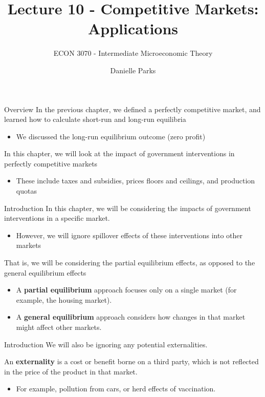 \documentclass{beamer}
\author{Danielle Parks}
\title{Lecture 10 - Competitive Markets: Applications}
\subtitle{ECON 3070 - Intermediate Microeconomic Theory}
\begin{document}
\begin{frame}
  \titlepage
\end{frame}

\begin{frame}{Overview}
  In the previous chapter, we defined a perfectly competitive market, and learned how to calculate short-run and long-run equilibria

  \begin{itemize}
    \item We discussed the long-run equilibrium outcome (zero profit)
  \end{itemize}

  In this chapter, we will look at the impact of government interventions in perfectly competitive markets

  \begin{itemize}
    \item These include taxes and subsidies, prices floors and ceilings, and production quotas
  \end{itemize}
\end{frame}


\begin{frame}{Introduction}
  In this chapter, we will be considering the impacts of government interventions in a specific market.

  \begin{itemize}
    \item However, we will ignore spillover effects of these interventions into other markets
  \end{itemize}

  \bigskip
  That is, we will be considering the partial equilibrium effects, as opposed to the general equilibrium effects

  \begin{itemize}
    \item A \textbf{partial equilibrium} approach focuses only on a single market (for example, the housing market).
    \item A \textbf{general equilibrium} approach considers how changes in that market might affect other markets.
  \end{itemize}  

\end{frame}

\begin{frame}{Introduction}
  We will also be ignoring any potential externalities.

  \bigskip
  An \textbf{externality} is a cost or benefit borne on a third party, which is not reflected in the price of the product in that market.
  
  \begin{itemize}
    \item For example, pollution from cars, or herd effects of vaccination.
  \end{itemize}
\end{frame}
\end{document}
